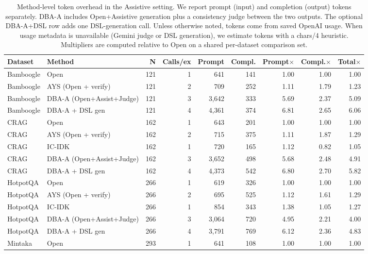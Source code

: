 \begin{table}[t]
\centering
\caption{Method-level token overhead in the Assistive setting. We report prompt (input) and completion (output) tokens separately. DBA-A includes Open+Assistive generation plus a consistency judge between the two outputs. The optional DBA-A+DSL row adds one DSL-generation call. Unless otherwise noted, tokens come from saved OpenAI usage. When usage metadata is unavailable (Gemini judge or DSL generation), we estimate tokens with a chars/4 heuristic. Multipliers are computed relative to Open on a shared per-dataset comparison set.}
\label{tab:efficiency_method_comparison_assistive}
\begin{tabular}{llrrrrrrr}
\toprule
\textbf{Dataset} & \textbf{Method} & \textbf{N} & \textbf{Calls/ex} & \textbf{Prompt} & \textbf{Compl.} & \textbf{Prompt$\times$} & \textbf{Compl.$\times$} & \textbf{Total$\times$} \\
\midrule
Bamboogle & Open & 121 & 1 & 641 & 141 & 1.00 & 1.00 & 1.00 \\
Bamboogle & AYS (Open + verify) & 121 & 2 & 709 & 252 & 1.11 & 1.79 & 1.23 \\
Bamboogle & DBA-A (Open+Assist+Judge) & 121 & 3 & 3,642 & 333 & 5.69 & 2.37 & 5.09 \\
Bamboogle & DBA-A + DSL gen & 121 & 4 & 4,361 & 374 & 6.81 & 2.65 & 6.06 \\
CRAG & Open & 162 & 1 & 643 & 201 & 1.00 & 1.00 & 1.00 \\
CRAG & AYS (Open + verify) & 162 & 2 & 715 & 375 & 1.11 & 1.87 & 1.29 \\
CRAG & IC-IDK & 162 & 1 & 720 & 165 & 1.12 & 0.82 & 1.05 \\
CRAG & DBA-A (Open+Assist+Judge) & 162 & 3 & 3,652 & 498 & 5.68 & 2.48 & 4.91 \\
CRAG & DBA-A + DSL gen & 162 & 4 & 4,373 & 542 & 6.80 & 2.70 & 5.82 \\
HotpotQA & Open & 266 & 1 & 619 & 326 & 1.00 & 1.00 & 1.00 \\
HotpotQA & AYS (Open + verify) & 266 & 2 & 695 & 525 & 1.12 & 1.61 & 1.29 \\
HotpotQA & IC-IDK & 266 & 1 & 854 & 343 & 1.38 & 1.05 & 1.27 \\
HotpotQA & DBA-A (Open+Assist+Judge) & 266 & 3 & 3,064 & 720 & 4.95 & 2.21 & 4.00 \\
HotpotQA & DBA-A + DSL gen & 266 & 4 & 3,791 & 769 & 6.12 & 2.36 & 4.83 \\
Mintaka & Open & 293 & 1 & 641 & 108 & 1.00 & 1.00 & 1.00 \\

\end{tabular}
\end{table}
